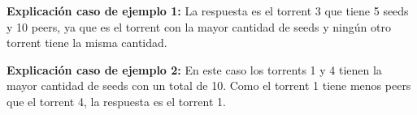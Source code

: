 \documentclass{oci}
\begin{document}
\begin{sampleDescription}
\begin{center}
    \begin{minipage}{0.95\textwidth}
    \textbf{Explicación caso de ejemplo 1:} La respuesta es el torrent 3 que tiene 5 seeds y 10 peers,
    ya que es el torrent con la mayor cantidad de seeds y ningún otro torrent tiene la misma cantidad.
    \end{minipage}
\end{center}
\begin{center}
    \begin{minipage}{0.95\textwidth}
    \textbf{Explicación caso de ejemplo 2:} En este caso los torrents 1 y 4 tienen la mayor cantidad
    de seeds con un total de 10.
    Como el torrent 1 tiene menos peers que el torrent 4, la respuesta es el torrent 1.
    \end{minipage}
\end{center}

\end{sampleDescription}
\end{document}
